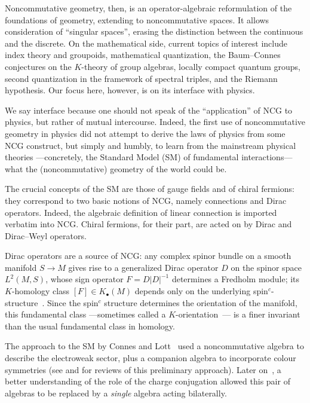 \documentclass[a4paper,12pt]{article}
\makeatletter
\newcommand{\1}{\mathbf{1}}         %
\newcommand{\7}{\dagger}            %
\newcommand{\8}{\bullet}            %
\renewcommand{\.}{\cdot}            %
\renewcommand{\:}{\colon}           %
\def\section{\@startsection{section}{1}{\z@}{-3.5ex plus -1ex minus
 -.2ex}{2.3ex plus .2ex}{\large\bf}}
\makeatother
\begin{document}
Noncommutative geometry, then, is an operator-algebraic reformulation
of the foundations of geometry, extending to noncommutative spaces. It
allows consideration of ``singular spaces'', erasing the distinction
between the continuous and the discrete. On the mathematical side,
current topics of interest include index theory and groupoids,
mathematical quantization, the Baum--Connes conjectures on the
$K$-theory of group algebras, locally compact quantum groups, second
quantization in the framework of spectral triples, and the Riemann
hypothesis. Our focus here, however, is on its interface with physics.



\section{NCG and the Standard Model}

We say interface because one should not speak of the ``application''
of NCG to physics, but rather of mutual intercourse. Indeed, the first
use of noncommutative geometry in physics did not attempt to derive
the laws of physics from some NCG construct, but simply and humbly, to
learn from the mainstream physical theories ---concretely, the
Standard Model (SM) of fundamental interactions--- what the
(noncommutative) geometry of the world could be.

The crucial concepts of the SM are those of gauge fields and of chiral
fermions: they correspond to two basic notions of NCG, namely
connections and Dirac operators. Indeed, the algebraic definition of
linear connection is imported verbatim into NCG. Chiral fermions, for
their part, are acted on by Dirac and Dirac--Weyl operators.

Dirac operators are a source of NCG: any complex spinor bundle on a
smooth manifold $S \to M$ gives rise to a generalized Dirac operator
$D$ on the spinor space $L^2(M,S)$, whose
sign operator $F = D|D|^{-1}$ determines a Fredholm module; its
$K$-homology class $[F] \in K_\8(M)$ depends only on the underlying
spin$^c$-structure~\cite{BaumD,HigsonR}. Since the spin$^c$ structure
determines the orientation of the manifold, this fundamental class
---sometimes called a $K$-orientation~\cite{AtiyahBS}--- is a finer
invariant than the usual fundamental class in homology.

The approach to the SM by Connes and Lott~\cite{ConnesL} used a
noncommutative algebra to describe the electroweak sector, plus a
companion algebra to incorporate colour symmetries (see \cite{Sirius}
and \cite{KastlerS} for reviews of this preliminary approach). Later
on~\cite{ConnesReal}, a better understanding of the role of the charge
conjugation allowed this pair of algebras to be replaced by a
\textit{single} algebra acting bilaterally.
\end{document}
